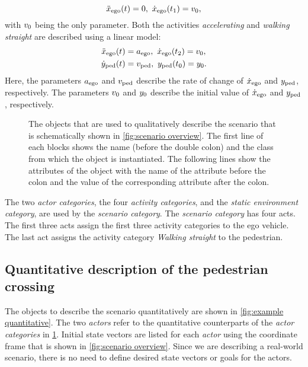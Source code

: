 \begin{equation} \label{eq:constant model}
	\ddot{x}_{\mathrm{ego}}(t) = 0,\ \dot{x}_{\mathrm{ego}}(t_{1}) = v_{0},
\end{equation}
with $v_{0}$ being the only parameter.
Both the activities \emph{accelerating} and \emph{walking straight} are described using a linear model:
\begin{align}
	\ddot{x}_{\mathrm{ego}}(t) &= a_{\mathrm{ego}},\ \dot{x}_{\mathrm{ego}}(t_{2}) = v_{0}, \label{eq:ego accelerating} \\
	\dot{y}_{\mathrm{ped}}(t) &= v_{\mathrm{ped}},\ y_{\mathrm{ped}}(t_{0}) = y_{0}. \label{eq:pedestrian walking}
\end{align}
Here, the parameters $a_{\mathrm{ego}}$ and $v_{\mathrm{ped}}$ describe the rate of change of $\dot{x}_{\mathrm{ego}}$ and $y_{\mathrm{ped}}$, respectively. The parameters $v_{0}$ and $y_{0}$ describe the initial value of $\dot{x}_{\mathrm{ego}}$ and $y_{\mathrm{ped}}$, respectively.


\begin{figure}
	\centering
	
	\caption{The objects that are used to qualitatively describe the scenario that is schematically shown in \cref{fig:scenario overview}. The first line of each blocks shows the name (before the double colon) and the class from which the object is instantiated. The following lines show the attributes of the object with the name of the attribute before the colon and the value of the corresponding attribute after the colon.}
	\label{fig:example qualitative}
\end{figure}


The two \textit{actor categories}, the four \textit{activity categories}, and the \textit{static environment category}, are used by the \textit{scenario category}. The \textit{scenario category} has four acts. The first three acts assign the first three activity categories to the ego vehicle. The last act assigns the activity category \emph{Walking straight} to the pedestrian.

\subsection{Quantitative description of the pedestrian crossing}
\label{sec:example quantitative}
The objects to describe the scenario quantitatively are shown in \cref{fig:example quantitative}. The two \textit{actors} refer to the quantitative counterparts of the \textit{actor categories} in \cref{fig:example qualitative}. Initial \cstart state vectors \cend are listed for each \textit{actor} using the coordinate frame that is shown in \cref{fig:scenario overview}. 
Since we are describing a real-world scenario, there is no need to define desired \cstart state vectors \cend or goals for the actors.


